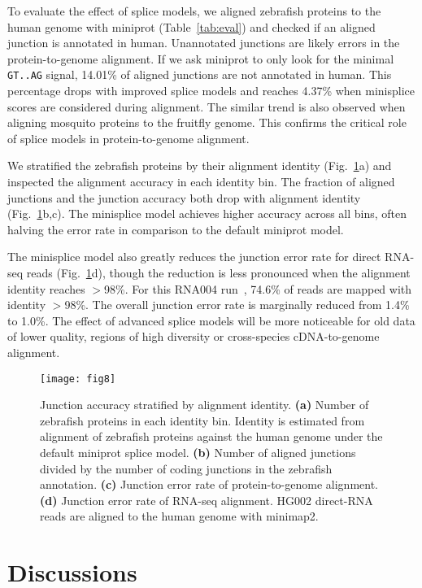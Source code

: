 \documentclass[webpdf,contemporary,large,namedate]{oup-authoring-template}%
\begin{document}
To evaluate the effect of splice models,
we aligned zebrafish proteins to the human genome with miniprot (Table~\ref{tab:eval})
and checked if an aligned junction is annotated in human.
Unannotated junctions are likely errors in the protein-to-genome alignment.
If we ask miniprot to only look for the minimal {\tt GT..AG} signal, 14.01\% of aligned junctions are not annotated in human.
This percentage drops with improved splice models
and reaches 4.37\% when minisplice scores are considered during alignment.
The similar trend is also observed when aligning mosquito proteins to the fruitfly genome.
This confirms the critical role of splice models in protein-to-genome alignment.

We stratified the zebrafish proteins by their alignment identity (Fig.~\ref{fig:map}a)
and inspected the alignment accuracy in each identity bin.
The fraction of aligned junctions and the junction accuracy both drop with alignment identity (Fig.~\ref{fig:map}b,c).
The minisplice model achieves higher accuracy across all bins, often halving the error rate in comparison to the default miniprot model.

The minisplice model also greatly reduces the junction error rate for direct RNA-seq reads (Fig.~\ref{fig:map}d),
though the reduction is less pronounced when the alignment identity reaches $>$98\%.
For this RNA004 run~\citep{Zheng2024.11.17.624050}, 74.6\% of reads are mapped with identity $>$98\%.
The overall junction error rate is marginally reduced from 1.4\% to 1.0\%.
The effect of advanced splice models will be more noticeable for old data of lower quality, regions of high diversity or cross-species cDNA-to-genome alignment.

\begin{figure}[bt]
\texttt{[image: fig8]}
\caption{Junction accuracy stratified by alignment identity.
{\bf (a)} Number of zebrafish proteins in each identity bin.
Identity is estimated from alignment of zebrafish proteins against the human genome under the default miniprot splice model.
{\bf (b)} Number of aligned junctions divided by the number of coding junctions in the zebrafish annotation.
{\bf (c)} Junction error rate of protein-to-genome alignment.
{\bf (d)} Junction error rate of RNA-seq alignment.
HG002 direct-RNA reads are aligned to the human genome with minimap2.}\label{fig:map}
\end{figure}

\section{Discussions}
\end{document}
